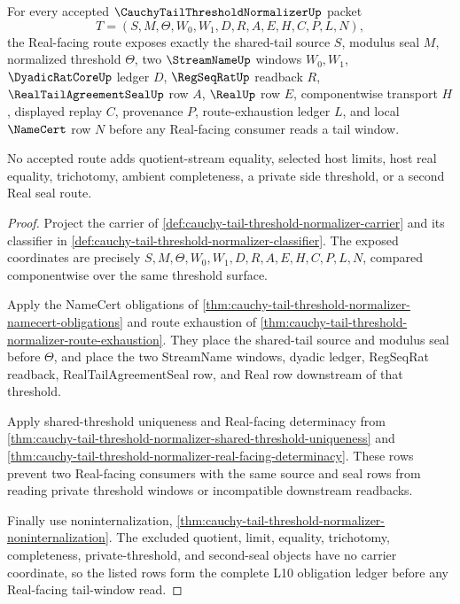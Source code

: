 \begin{theorem}
\label{thm:cauchy-tail-threshold-normalizer-obligation-ledger}
For every accepted $\CauchyTailThresholdNormalizerUp$ packet
$$
T=(S,M,\Theta,W_0,W_1,D,R,A,E,H,C,P,L,N),
$$
the Real-facing route exposes exactly the shared-tail source $S$, modulus seal $M$, normalized threshold $\Theta$, two $\StreamNameUp$ windows $W_0,W_1$, $\DyadicRatCoreUp$ ledger $D$, $\RegSeqRatUp$ readback $R$, $\RealTailAgreementSealUp$ row $A$, $\RealUp$ row $E$, componentwise transport $H$, displayed replay $C$, provenance $P$, route-exhaustion ledger $L$, and local $\NameCert$ row $N$ before any Real-facing consumer reads a tail window.

No accepted route adds quotient-stream equality, selected host limits, host real equality, trichotomy, ambient completeness, a private side threshold, or a second Real seal route.
\end{theorem}
\begin{proof}
Project the carrier of \autoref{def:cauchy-tail-threshold-normalizer-carrier} and its classifier in \autoref{def:cauchy-tail-threshold-normalizer-classifier}. The exposed coordinates are precisely $S,M,\Theta,W_0,W_1,D,R,A,E,H,C,P,L,N$, compared componentwise over the same threshold surface.

Apply the NameCert obligations of \autoref{thm:cauchy-tail-threshold-normalizer-namecert-obligations} and route exhaustion of \autoref{thm:cauchy-tail-threshold-normalizer-route-exhaustion}. They place the shared-tail source and modulus seal before $\Theta$, and place the two StreamName windows, dyadic ledger, RegSeqRat readback, RealTailAgreementSeal row, and Real row downstream of that threshold.

Apply shared-threshold uniqueness and Real-facing determinacy from \autoref{thm:cauchy-tail-threshold-normalizer-shared-threshold-uniqueness} and \autoref{thm:cauchy-tail-threshold-normalizer-real-facing-determinacy}. These rows prevent two Real-facing consumers with the same source and seal rows from reading private threshold windows or incompatible downstream readbacks.

Finally use noninternalization, \autoref{thm:cauchy-tail-threshold-normalizer-noninternalization}. The excluded quotient, limit, equality, trichotomy, completeness, private-threshold, and second-seal objects have no carrier coordinate, so the listed rows form the complete L10 obligation ledger before any Real-facing tail-window read.
\end{proof}

